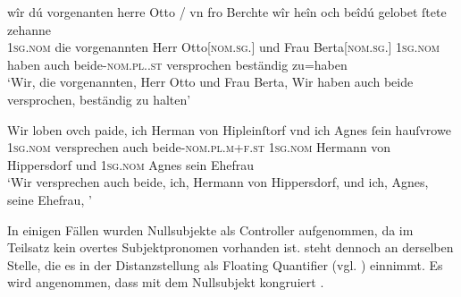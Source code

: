 \begin{exe}
\ex \label{ex:cao_diffgend_11_beide}
	\begin{xlist}
	\ex \label{ex:cao_diffgend_11_beide_1}
		\gll wîr dú vorgenanten herre Otto / vn fro Berchte
				\textelp{} wîr heîn och beîdú \textelp{}
				gelobet ſtete zehanne \\
			\textsc{1sg\subMF.nom} die vorgenannten Herr Otto[\textsc{nom.sg.\MascM}] {}
				und Frau Berta[\textsc{nom.sg.\FemF}] {} \textsc{1sg\subMF.nom} haben
				auch beide-\textsc{nom.pl.\NeutMF.st} {} versprochen beständig
				zu=haben \\
		\trans `Wir, die vorgenannten, Herr Otto und Frau Berta,
		\textelp{} Wir haben auch beide \textelp{} versprochen, beständig zu
			halten'
			\parencites(Nr.~2931, Basel, 1298)[223,1--6]{cao4}

	\ex \label{ex:cao_diffgend_11_beide_2}
		\gll Wir loben ovch paide, ich Herman von
			Hipleinſtorf vnd ich Agnes ſein hauſvrowe \textelp{} \\
			\textsc{1sg\subMF.nom} versprechen auch beide-\textsc{nom.pl.m+f\subMF.st}
			\textsc{1sg\subM.nom} Hermann von Hippersdorf und \textsc{1sg\subF.nom}
			Agnes sein Ehefrau {} \\
		\trans `Wir versprechen auch beide, ich, Hermann von
			Hippersdorf, und ich, Agnes, seine Ehefrau, \textelp{}'
			\parencites(Nr.~N~701, Wien, 1295)[506,32--33]{cao5}
	\end{xlist}
\end{exe}

\label{phsec:vbctrl}
In einigen Fällen wurden Nullsubjekte als Controller aufgenommen, da im
Teilsatz kein overtes Subjektpronomen vorhanden ist.  steht
dennoch an derselben Stelle, die es in der Distanzstellung als Floating
Quantifier (vgl. ) einnimmt. Es wird angenommen, dass
 mit dem Nullsubjekt kongruiert
\autocites[siehe auch][419]{dalrymple2001}[210]{bresnanetal2016}.

